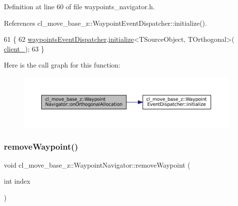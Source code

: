 Definition at line 60 of file waypoints\+\_\+navigator.\+h.



References cl\+\_\+move\+\_\+base\+\_\+z\+::\+Waypoint\+Event\+Dispatcher\+::initialize().


\begin{DoxyCode}
61   \{
62     \hyperlink{classcl__move__base__z_1_1WaypointNavigator_a4f2be7a9741e8535c414e63335d752a0}{waypointsEventDispatcher}.\hyperlink{classcl__move__base__z_1_1WaypointEventDispatcher_a89674461d32af85dd64ca49290dbd010}{initialize}<TSourceObject, TOrthogonal>(
      \hyperlink{classcl__move__base__z_1_1WaypointNavigator_afc5ad5c5d15f41437286b8fca1d3a324}{client\_});
63   \}
\end{DoxyCode}
Here is the call graph for this function\+:
\nopagebreak
\begin{figure}[H]
\begin{center}
\leavevmode
\includegraphics[width=350pt]{classcl__move__base__z_1_1WaypointNavigator_aa41d28f71eccc3a61932d09f8ea8f5f5_cgraph}
\end{center}
\end{figure}
\mbox{\label{classcl__move__base__z_1_1WaypointNavigator_a0a7e9e35ed5ba02ff4cfb580ffa25e9a}} 
\subsubsection{\texorpdfstring{remove\+Waypoint()}{removeWaypoint()}}
{\footnotesize\ttfamily void cl\+\_\+move\+\_\+base\+\_\+z\+::\+Waypoint\+Navigator\+::remove\+Waypoint (\begin{DoxyParamCaption}\item[{int}]{index }\end{DoxyParamCaption})}



